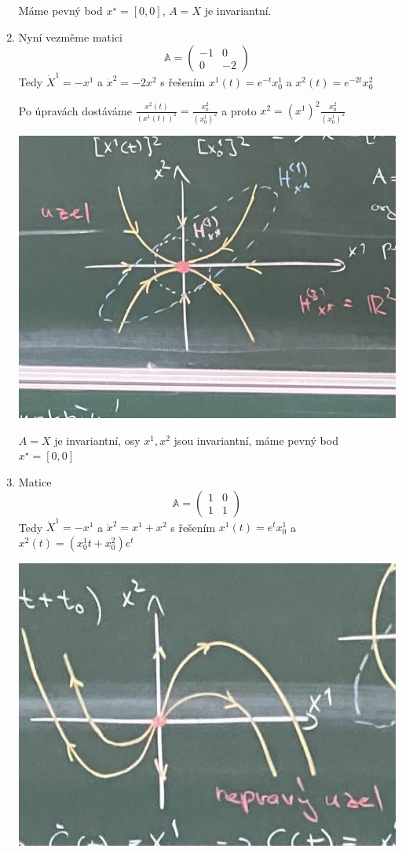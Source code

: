 \documentclass[../main.tex]{subfiles}
\begin{document}
\begin{example}
\begin{enumerate}
    Máme pevný bod $x^\star = [0,0]$, $A=X$ je invariantní.


    \item Nyní vezměme matici 
    \begin{equation}
        \mathbb{A} = \begin{pmatrix}
            -1 & 0 \\
            0 & -2 
            \end{pmatrix}
    \end{equation}
    Tedy $\dot{X}^1 = - x^1$ a $\dot{x}^2 = -2x^2$ s řešením $x^1(t) = e^{-t}x^1_0$ a $x^2(t) = e^{-2t} x_0^2$

    Po úpravách dostáváme $\frac{x^2(t)}{\left(x^1(t)\right)^2} = \frac{x^2_0}{\left(x_0^1\right)^2}$ a proto 
    $x^2 = \left(x^1\right)^2 \frac{x_0^2}{\left(x_0^1\right)^2}$

    \begin{center}
        \includegraphics[width=0.5\linewidth]{images/uzel.jpg}
    \end{center}

    $A=X$ je invariantní, osy $x^1, x^2$ jsou invariantní, máme pevný bod $x^\star = [0,0]$

    \item Matice \begin{equation}
        \mathbb{A} = \begin{pmatrix}
            1 & 0 \\
            1 & 1 
            \end{pmatrix}
    \end{equation}
    Tedy $\dot{X}^1 = - x^1$ a $\dot{x}^2 = x^1 + x^2$ s řešením $x^1(t) = e^{t}x^1_0$ a $x^2(t) = (x_0^1 t + x_0^2)e^t $
    \begin{center}
        \includegraphics[width=0.5\linewidth]{images/nepravy-uzel.jpg}
    \end{center}


\end{enumerate}
\end{example}
\end{document}
